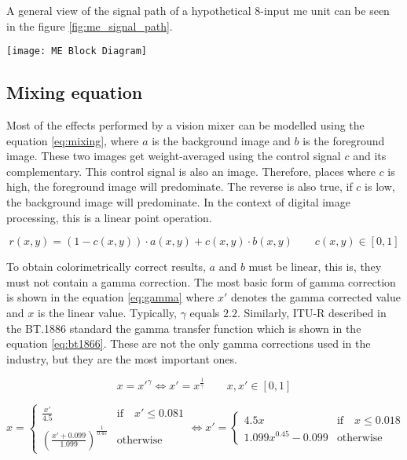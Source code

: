 \documentclass[../main.tex]{subfiles}
\begin{document}
A general view of the signal path of a hypothetical 8-input \gls{me} unit can be seen in the figure \ref{fig:me_signal_path}.\newline

\begin{sidewaysfigure}[htbp]
    \centering
    \texttt{[image: ME Block Diagram]}

    \label{fig:me_signal_path}
    \caption{Signal path of a hypothetical ME with 8 inputs, 4 USKs and 2 DSKs}
\end{sidewaysfigure}

\subsection{Mixing equation}
Most of the effects performed by a vision mixer can be modelled using the equation \eqref{eq:mixing}, where $a$ is the background image and $b$ is the foreground image. These two images get weight-averaged using the control signal $c$ and its complementary. This control signal is also an image. Therefore, places where $c$ is high, the foreground image will predominate. The reverse is also true, if $c$ is low, the background image will predominate. In the context of digital image processing, this is a linear point operation.

\begin{equation} \label{eq:mixing}
    r(x, y) = (1 - c(x, y))  \cdot a(x, y) + c(x, y) \cdot b(x, y) \qquad c(x, y) \in [0, 1]
\end{equation}

To obtain colorimetrically correct results, $a$ and $b$ must be linear, this is, they must not contain a gamma correction. The most basic form of gamma correction is shown in the equation \eqref{eq:gamma} where $x'$ denotes the gamma corrected value and $x$ is the linear value. Typically, $\gamma$ equals $2.2$. Similarly, ITU-R described in the BT.1886 standard\cite{bt1886} the gamma transfer function which is shown in the equation \eqref{eq:bt1866}. These are not the only gamma corrections used in the industry, but they are the most important ones.\newline

\begin{equation} \label{eq:gamma}
    x = x'^{\gamma} \Longleftrightarrow x' = x^{\frac{1}{\gamma}} \qquad x, x' \in [0, 1]
\end{equation}

\begin{equation} \label{eq:bt1866}
    x =
    \begin{cases}
        \frac{x'}{4.5} &\text{if} \quad x' \le 0.081 \\
        (\frac{x' + 0.099}{1.099})^{\frac{1}{0.45}} &\text{otherwise}
    \end{cases}
    \Longleftrightarrow
    x' =
    \begin{cases}
        4.5x &\text{if}\quad x \le 0.018 \\
        1.099x^{0.45} - 0.099 &\text{otherwise}
    \end{cases}
\end{equation}
\end{document}
